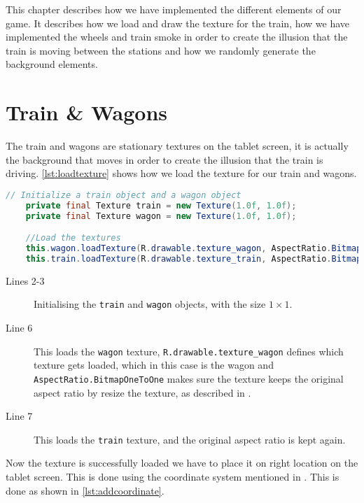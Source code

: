 This chapter describes how we have implemented the different elements of our game. It describes how we load and draw the texture for the train, how we have implemented the wheels and train smoke in order to create the illusion that the train is moving between the stations and how we randomly generate the background elements.

\section{Train \& Wagons}

The train and wagons are stationary textures on the tablet screen, it is actually the background that moves in order to create the illusion that the train is driving. \autoref{lst:loadtexture} shows how we load the texture for our train and wagons.

\begin{lstlisting}[language=java,firstnumber=1,caption={Loading the texture for our train and wagons.},label=lst:loadtexture] 
	// Initialize a train object and a wagon object
	private final Texture train = new Texture(1.0f, 1.0f);
	private final Texture wagon = new Texture(1.0f, 1.0f);

	//Load the textures
	this.wagon.loadTexture(R.drawable.texture_wagon, AspectRatio.BitmapOneToOne);
	this.train.loadTexture(R.drawable.texture_train, AspectRatio.BitmapOneToOne); 
\end{lstlisting}

\begin{description}
\item[Lines 2-3] Initialising the \lstinline|train| and \lstinline|wagon| objects, with the size $1 \times 1$.
\item[Line 6] This loads the \lstinline|wagon| texture, \lstinline|R.drawable.texture_wagon| defines which texture gets loaded, which in this case is the wagon and \lstinline|AspectRatio.BitmapOneToOne| makes sure the texture keeps the original aspect ratio by resize the texture, as described in .
\item[Line 7] This loads the \lstinline|train| texture, and the original aspect ratio is kept again.
\end{description}

Now the texture is successfully loaded we have to place it on right location on the tablet screen. This is done using the coordinate system mentioned in . This is done as shown in \autoref{lst:addcoordinate}.

